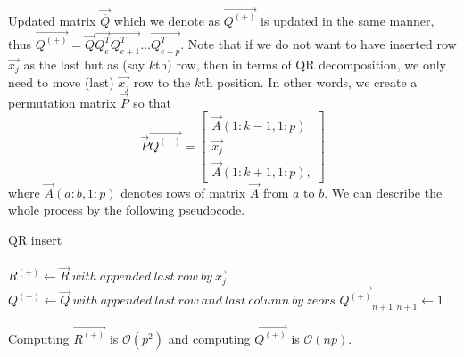 Updated matrix $\vec{\overline{Q}}$ which we denote as $\vec{Q^{(+)}}$
is updated in the same manner, thus $\vec{Q^{(+)}} = \vec{Q}\vec{Q_e^T}\vec{Q_{e+1}^T}\ldots\vec{Q_{e+p}^T}$.
Note that if we do not want to have inserted row $\vec{x_j}$ as the last but as (say $k$th) row, then in terms of QR decomposition, we only need to move (last) $\vec{x_j}$ row to the $k$th position. In other words, we create a permutation  matrix $\vec{P}$ so that 
\begin{equation}
    \vec{P}\vec{Q^{(+)}} = \begin{bmatrix}
        \vec{A}(1:k-1 , 1:p) \\
        \vec{x_j} \\
        \vec{A}(1:k+1 , 1:p), 
    \end{bmatrix}
\end{equation} 
where $\vec{A}(a:b , 1:p) $ denotes rows of matrix $\vec{A}$ from $a$ to $b$.
We can describe the whole process by the following pseudocode. 



\begin{algorithm}[H]
    \label{addingrowqr}

      \caption{QR insert}
      $\vec{R^{(+)}} \gets \vec{R}~with~appended~last~row~by~\vec{x_j}$\;
      $\vec{Q^{(+)}} \gets \vec{Q}~with~appended~last~row~and~last~column~by~zeors$\;
      $\vec{Q^{(+)}}_{n+1, n+1} \gets 1$ 


      

    \;
\end{algorithm}


\begin{observation} \label{qrinserttime}
Computing $\vec{R^{(+)}}$ is $\mathcal{O}(p^2)$ and computing $\vec{Q^{(+)}}$ is $\mathcal{O}(np)$.
\end{observation}

